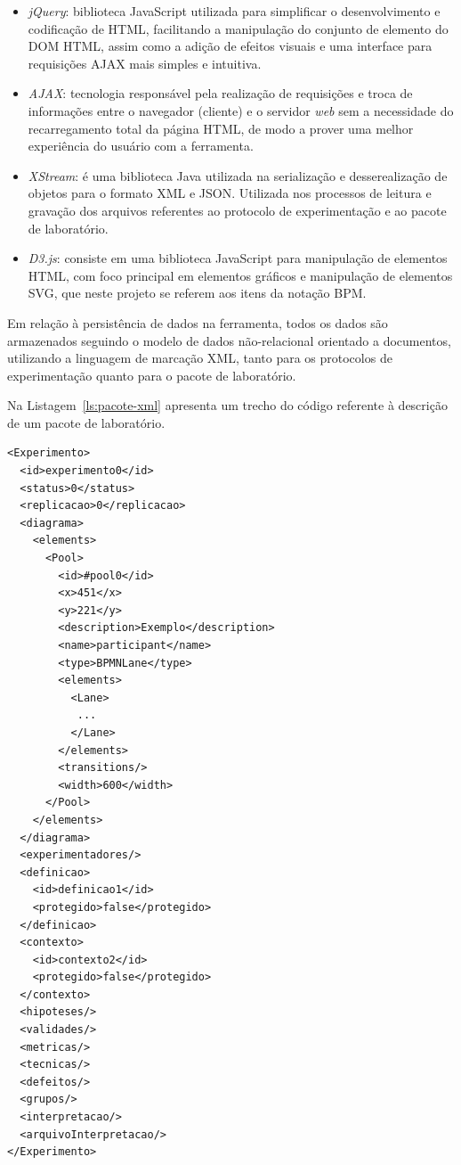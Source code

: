 \begin{itemize}
\item \textit{jQuery}: biblioteca JavaScript utilizada para simplificar o desenvolvimento
e codificação de HTML, facilitando a manipulação do conjunto de elemento do DOM HTML, assim como a adição de efeitos visuais e uma interface para requisições AJAX mais simples e intuitiva.

\item \textit{AJAX}: tecnologia responsável pela realização de requisições e troca de informações entre o navegador (cliente) e o servidor \textit{web} sem a necessidade do recarregamento total da página HTML, de modo a prover uma melhor experiência do usuário com a ferramenta.

\item \textit{XStream}: é uma biblioteca Java utilizada na serialização e desserealização de objetos para o formato XML e JSON. Utilizada nos processos de leitura e gravação dos arquivos referentes ao protocolo de experimentação e ao pacote de laboratório.

\item \textit{D3.js}: consiste em uma biblioteca JavaScript para manipulação de elementos HTML, com foco principal em elementos gráficos e manipulação de elementos SVG, que neste projeto se referem aos itens da notação BPM. 

\end{itemize}

Em relação à persistência de dados na ferramenta, todos os dados são armazenados seguindo o modelo de dados não-relacional orientado a documentos, utilizando a linguagem de marcação XML, tanto para os protocolos de experimentação quanto para o pacote de laboratório.

Na Listagem~\ref{ls:pacote-xml} apresenta um trecho do código referente à descrição de um pacote de laboratório.

\lstset{language=XML}
\begin{lstlisting}[caption=Descrição reduzida de um pacote de laboratório., label=ls:pacote-xml]
<Experimento>
  <id>experimento0</id>
  <status>0</status>
  <replicacao>0</replicacao>
  <diagrama>
    <elements>
      <Pool>
        <id>#pool0</id>
        <x>451</x>
        <y>221</y>
        <description>Exemplo</description>
        <name>participant</name>
        <type>BPMNLane</type>
        <elements>
          <Lane>
           ...
          </Lane>
        </elements>
        <transitions/>
        <width>600</width>
      </Pool>
    </elements>
  </diagrama>
  <experimentadores/>
  <definicao>
    <id>definicao1</id>
    <protegido>false</protegido>
  </definicao>
  <contexto>
    <id>contexto2</id>
    <protegido>false</protegido>
  </contexto>
  <hipoteses/>
  <validades/>
  <metricas/>
  <tecnicas/>
  <defeitos/>
  <grupos/>
  <interpretacao/>
  <arquivoInterpretacao/>
</Experimento>

\end{lstlisting}

